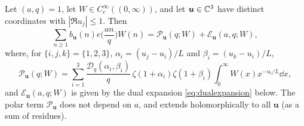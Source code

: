 \documentclass[11pt,colorlinks]{charlie}
\begin{document}
\begin{lemma}\label{lem:polar}
Let $(a,q)=1$, let $W\in C_c^\infty((0,\infty))$, and let $\boldsymbol u\in\mathbb{C}^3$ have distinct coordinates with $|\Re u_j|\le1$. Then
\[
 \sum_{n\ge1}b_{\boldsymbol u}(n)e\Big(\frac{an}q\Big)W(n)=\mathcal P_{\boldsymbol u}(q;W)+\mathcal E_{\boldsymbol u}(a,q;W),
\]
where, for $\{i,j,k\}=\{1,2,3\}$, $\alpha_i=(u_j-u_i)/L$ and $\beta_i=(u_k-u_i)/L$,
\begin{equation}\label{eq:polarterm}
 \mathcal P_{\boldsymbol u}(q;W)=\sum_{i=1}^3\frac{\mathcal D_q(\alpha_i,\beta_i)}q\,\zeta(1+\alpha_i)\zeta(1+\beta_i)\int_0^\infty W(x)x^{-u_i/L}\dd x,
\end{equation}
and $\mathcal E_{\boldsymbol u}(a,q;W)$ is given by the dual expansion \eqref{eq:dualexpansion} below. The polar term $\mathcal P_{\boldsymbol u}$ does not depend on $a$, and extends holomorphically to all $\boldsymbol u$ (as a sum of residues).
\end{lemma}
\end{document}
